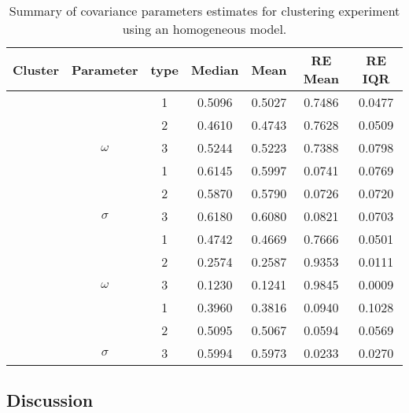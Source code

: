 \begin{table}[b]\centering
\caption{Summary of covariance parameters estimates for clustering experiment using an homogeneous model.}
\begin{knitrout}
\color{fgcolor}
\begin{tabular}{ccccccc}
\toprule
Cluster & Parameter & type & Median & Mean & RE Mean & RE IQR\\
\midrule
 &  & 1 & 0.5096 & 0.5027 & 0.7486 & 0.0477\\

 &  & 2 & 0.4610 & 0.4743 & 0.7628 & 0.0509\\

 & \multirow{-3}{*}{\centering\arraybackslash $\omega$} & 3 & 0.5244 & 0.5223 & 0.7388 & 0.0798\\
\cmidrule{2-7}
 &  & 1 & 0.6145 & 0.5997 & 0.0741 & 0.0769\\

 &  & 2 & 0.5870 & 0.5790 & 0.0726 & 0.0720\\

\multirow{-6}{*}{\centering\arraybackslash 1} & \multirow{-3}{*}{\centering\arraybackslash $\sigma$} & 3 & 0.6180 & 0.6080 & 0.0821 & 0.0703\\
\cmidrule{1-7}
 &  & 1 & 0.4742 & 0.4669 & 0.7666 & 0.0501\\

 &  & 2 & 0.2574 & 0.2587 & 0.9353 & 0.0111\\

 & \multirow{-3}{*}{\centering\arraybackslash $\omega$} & 3 & 0.1230 & 0.1241 & 0.9845 & 0.0009\\
\cmidrule{2-7}
 &  & 1 & 0.3960 & 0.3816 & 0.0940 & 0.1028\\

 &  & 2 & 0.5095 & 0.5067 & 0.0594 & 0.0569\\

\multirow{-6}{*}{\centering\arraybackslash 2} & \multirow{-3}{*}{\centering\arraybackslash $\sigma$} & 3 & 0.5994 & 0.5973 & 0.0233 & 0.0270\\
\bottomrule
\end{tabular}


\end{knitrout}
\label{tab:cl-homog-par}
\end{table}


\subsection{Discussion}

